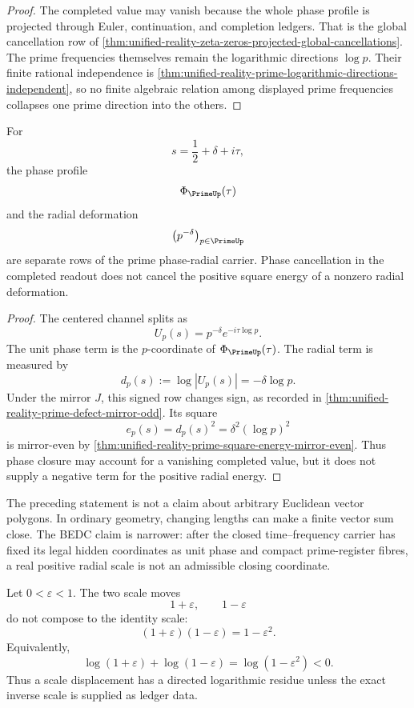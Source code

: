 \begin{proof}
The completed value may vanish because the whole phase profile is
projected through Euler, continuation, and completion ledgers.  That is
the global cancellation row of
\autoref{thm:unified-reality-zeta-zeros-projected-global-cancellations}.
The prime frequencies themselves remain the logarithmic directions
$\log p$.  Their finite rational independence is
\autoref{thm:unified-reality-prime-logarithmic-directions-independent},
so no finite algebraic relation among displayed prime frequencies
collapses one prime direction into the others.
\end{proof}

\begin{theorem}
\label{thm:unified-reality-radial-deformation-not-phase-closure}
For
$$
s=\frac12+\delta+i\tau,
$$
the phase profile
$$
\Phi_{\PrimeUp}(\tau)
$$
and the radial deformation
$$
\bigl(p^{-\delta}\bigr)_{p\in\PrimeUp}
$$
are separate rows of the prime phase-radial carrier.  Phase cancellation
in the completed readout does not cancel the positive square energy of a
nonzero radial deformation.
\end{theorem}

\begin{proof}
The centered channel splits as
$$
U_p(s)=p^{-\delta}e^{-i\tau\log p}.
$$
The unit phase term is the $p$-coordinate of
$\Phi_{\PrimeUp}(\tau)$.  The radial term is measured by
$$
d_p(s):=\log |U_p(s)|=-\delta\log p.
$$
Under the mirror $J$, this signed row changes sign, as recorded in
\autoref{thm:unified-reality-prime-defect-mirror-odd}.  Its square
$$
e_p(s)=d_p(s)^2=\delta^2(\log p)^2
$$
is mirror-even by
\autoref{thm:unified-reality-prime-square-energy-mirror-even}.  Thus
phase closure may account for a vanishing completed value, but it does
not supply a negative term for the positive radial energy.
\end{proof}

The preceding statement is not a claim about arbitrary Euclidean vector
polygons.  In ordinary geometry, changing lengths can make a finite
vector sum close.  The BEDC claim is narrower: after the closed
time--frequency carrier has fixed its legal hidden coordinates as unit
phase and compact prime-register fibres, a real positive radial scale is
not an admissible closing coordinate.

\begin{theorem}
\label{thm:unified-reality-symmetric-percentage-motion-scale-residue}
Let $0<\varepsilon<1$.  The two scale moves
$$
1+\varepsilon,
\qquad
1-\varepsilon
$$
do not compose to the identity scale:
$$
(1+\varepsilon)(1-\varepsilon)=1-\varepsilon^2.
$$
Equivalently,
$$
\log(1+\varepsilon)+\log(1-\varepsilon)
=
\log(1-\varepsilon^2)<0.
$$
Thus a scale displacement has a directed logarithmic residue unless the
exact inverse scale is supplied as ledger data.
\end{theorem}

